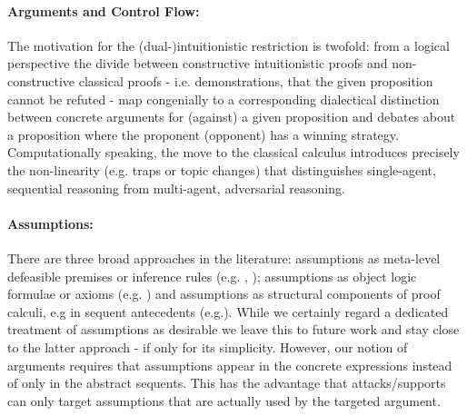 \documentclass{IOS-Book-Article}
\begin{document}
\paragraph{Arguments and Control Flow:} The motivation for the (dual-)intuitionistic restriction is twofold: from a logical perspective the divide between constructive intuitionistic proofs and non-constructive classical proofs - i.e. demonstrations, that the given proposition cannot be refuted - map congenially to a corresponding dialectical distinction between concrete arguments for (against) a given proposition and debates about a proposition where the proponent (opponent) has a winning strategy.%
Computationally speaking, the move to the classical calculus introduces precisely the non-linearity (e.g. traps or topic changes) that distinguishes single-agent, sequential reasoning from multi-agent, adversarial reasoning.

\paragraph{Assumptions: } There are three broad approaches in the literature: assumptions as meta-level defeasible premises or inference rules (e.g. \cite{BondarenkoDungKowalskiToni1997DefaultReasoning}, ); assumptions as object logic formulae or axioms (e.g. \cite{BesnardHunter2001DeductiveArguments}) and assumptions as structural components of proof calculi, e.g in sequent antecedents (e.g.\cite{ArieliStrasser2015SequentBasedLogicalArgumentation}).
While we certainly regard a dedicated treatment of assumptions as desirable we leave this to future work and stay close to the latter approach - if only for its simplicity.
However, our notion of arguments requires that assumptions appear in the concrete expressions instead of only in the abstract sequents. This has the advantage that attacks/supports can only target assumptions that are actually used by the targeted argument.
\end{document}
